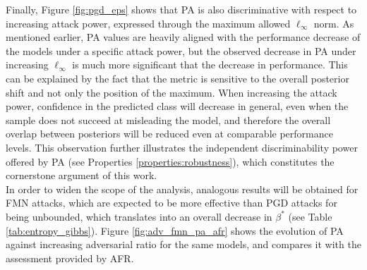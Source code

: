 Finally, Figure \ref{fig:pgd_eps} shows that PA is also discriminative with respect to
increasing attack power, expressed through the maximum allowed $\ell_\infty$ norm. 
As mentioned earlier, PA values are heavily aligned with the performance
decrease of the models under a specific attack power, but the observed decrease in PA 
under increasing $\ell_\infty$ is much more significant that the decrease 
in performance. This can be explained by the fact that the metric is sensitive 
to the overall posterior shift and not only the position of the maximum. When increasing 
the attack power, confidence in the predicted class will decrease in general, 
even when the sample does not succeed at misleading the model, and therefore the
overall overlap between posteriors will be reduced even at comparable performance 
levels. This observation further illustrates the independent discriminability power
offered by PA (see Properties \ref{properties:robustness}), which constitutes the 
cornerstone argument of this work. \\

In order to widen the scope of the analysis, analogous results will be obtained for
FMN attacks, which are expected to be more effective than PGD attacks for being 
unbounded, which translates into an overall decrease in $\beta^{*}$ (see 
Table \ref{tab:entropy_gibbs}). Figure \ref{fig:adv_fmn_pa_afr} shows the evolution 
of PA against increasing adversarial ratio for the same models, and compares
it with the assessment provided by AFR.


